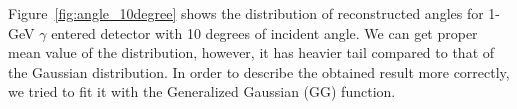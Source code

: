 \documentclass[jkps,preprint,fleqn,showpacs,showkeys]{revtex4}
\newcommand{\XGB}{XGBoost}
\begin{document}



Figure~\ref{fig:angle_10degree} shows the distribution of reconstructed angles for 1-GeV $\gamma$ entered detector with 10 degrees of incident angle. %
We can get proper mean value of the distribution, however, it has heavier tail compared to that of the Gaussian distribution. In order to describe the obtained result more correctly, we tried to fit it with the Generalized Gaussian (GG) function. 
\end{document}

